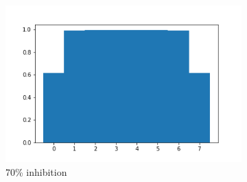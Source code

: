 \documentclass{article}
\begin{document}
\begin{figure}[h]
\begin{subfigure}[t]{0.32\linewidth}
		\includegraphics[width = 1.0\linewidth, trim={20 20 20 20}, clip=true]{../figures/D7_inhib_03.png}
		\caption{70\% inhibition}
		\label{fig:dF}
	\end{subfigure}
\caption{}
\label{fig:fit}
\end{figure}
\end{document}
